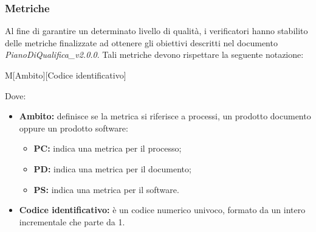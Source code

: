 \documentclass[11pt,a4paper]{article}
\begin{document}
{	
	\subsubsection{Metriche}
	Al fine di garantire un determinato livello di qualità, i verificatori hanno stabilito delle metriche finalizzate ad ottenere gli obiettivi descritti  nel documento \textit{PianoDiQualifica\_v2.0.0}. Tali metriche devono rispettare la seguente notazione: 
	\begin{center}
		M[Ambito][Codice identificativo]
	\end{center}
	Dove:
	\begin{itemize}
		\item \textbf{Ambito:} definisce se la metrica si riferisce a processi, un prodotto documento oppure un prodotto software:
		\begin{itemize}
			\item \textbf{PC:} indica una metrica per il processo;
			\item \textbf{PD:} indica una metrica per il documento;
			\item \textbf{PS:} indica una metrica per il software.
		\end{itemize}
		\item \textbf{Codice identificativo:} è un codice numerico univoco, formato da un intero incrementale che parte da 1.
	\end{itemize}
	
}
\end{document}
